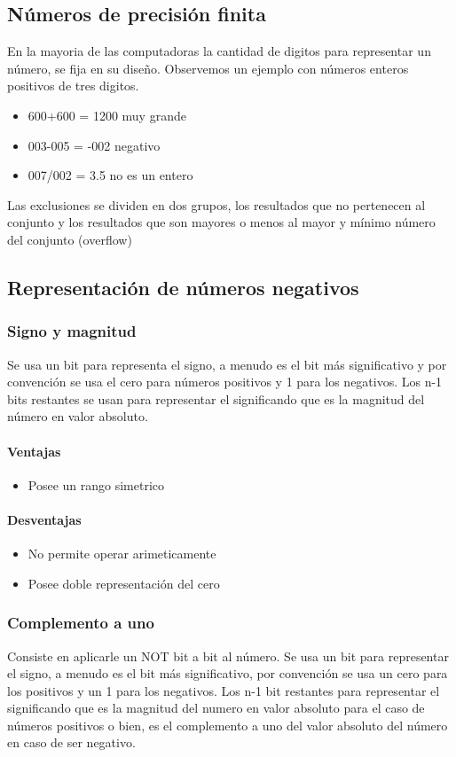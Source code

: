 \subsection{Números de precisión finita}
En la mayoria de las computadoras la cantidad de digitos para representar un número, se fija en su diseño. Observemos un ejemplo con números enteros positivos de tres digitos.
\begin{itemize}
	\item 600+600 = 1200 muy grande
	\item 003-005 = -002  negativo
	\item 007/002 = 3.5  no es un entero
\end{itemize}
Las exclusiones se dividen en dos grupos, los resultados que no pertenecen al conjunto
y los resultados que son mayores o menos al mayor y mínimo número del conjunto (overflow)

\subsection{Representación de números negativos}

\subsubsection{Signo y magnitud}
Se usa un bit para representa el signo, a menudo es el bit más significativo y por convención se usa el cero para números positivos y 1 para los negativos. Los n-1 bits restantes se usan para representar el significando que es la magnitud del número en valor absoluto.

\paragraph{Ventajas}
\begin{itemize}
\item Posee un rango simetrico
\end{itemize}

\paragraph{Desventajas}
\begin{itemize}
\item No permite operar arimeticamente
\item Posee doble representación del cero
\end{itemize}

\subsubsection{Complemento a uno}
Consiste en aplicarle un NOT bit a bit al número. Se usa un bit para representar el signo, a menudo es el bit más significativo, por convención se usa un cero para los positivos y un 1 para los negativos. Los n-1 bit restantes para representar el significando que es la magnitud del numero en valor absoluto para el caso de números positivos o bien, es el complemento a uno del valor absoluto del número en caso de ser negativo.

